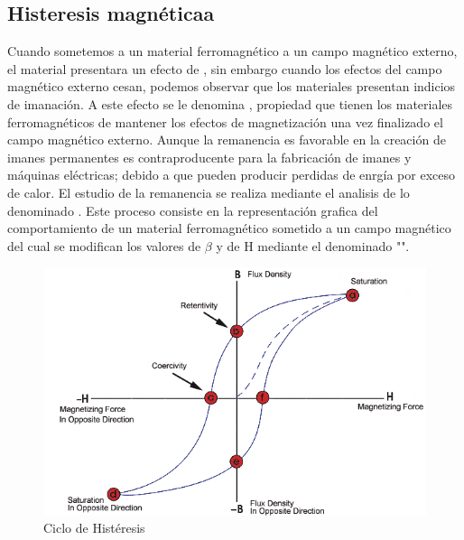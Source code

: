 \documentclass{report}
\begin{document}
  \subsection{Histeresis magnéticaa}\label{ssec:histeresis}
Cuando sometemos a un material ferromagnético a un campo magnético externo, el material presentara
un efecto de , sin embargo cuando los efectos del campo magnético externo cesan,
podemos observar que los materiales presentan indicios de imanación.
\vspace{1em}\newline
A este efecto se le denomina , propiedad que tienen los materiales ferromagnéticos 
de mantener los efectos de magnetización una vez finalizado el campo magnético externo.\newline
Aunque la remanencia es favorable en la creación de imanes permanentes es contraproducente para la fabricación de imanes
y máquinas eléctricas; debido a que pueden producir perdidas de enrgía por exceso de calor.
\vspace{1em}
\newline
El estudio de la remanencia se realiza mediante el analisis de lo denominado . Este proceso
consiste en la representación grafica del comportamiento de un material ferromagnético sometido a un campo magnético del cual
se modifican los valores de $\beta$ y de $\mathrm{H}$ mediante el denominado "".
\begin{figure}[h]
  \vspace{1em}
  \centering 
  \includegraphics[width=0.65\linewidth]{hysteresis/hysteresis.png}
  \caption{Ciclo de Histéresis}
  \label{fig:hysteresis}

\end{figure}
\newpage
\end{document}
